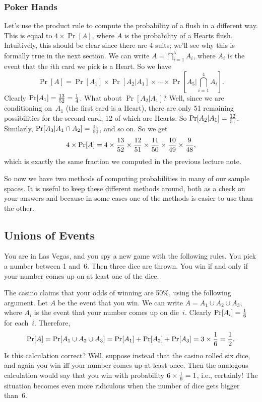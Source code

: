 \documentclass[11pt]{article}
\begin{document}
\subsubsection*{Poker Hands}
Let's use the product rule to compute the probability of a flush in a different
way. This is equal to $4\times\Pr[A]$, where $A$ is the
probability of a Hearts flush. Intuitively, this should be clear since there are 4 suits; we'll
see why this is formally true in the next section. We can write $A=\bigcap_{i=1}^5 A_i$,
where $A_i$ is the event that the $i$th card we pick is a Heart.
So we have $$
   {\textstyle\Pr[A]=\Pr[A_1]\times\Pr[A_2\vert A_1]\times\cdots\times
                \Pr[A_5\vert\bigcap_{i=1}^4 A_i]}.  $$
Clearly $\Pr[A_1]={{13}\over{52}}={1\over 4}$.  What about
$\Pr[A_2\vert A_1]$?  Well, since we are conditioning on~$A_1$ (the
first card is a Heart), there are only 51 remaining possibilities for
the second card, 12 of which are Hearts.
So $\Pr[A_2\vert A_1]={{12}\over{51}}$.  Similarly,
$\Pr[A_3\vert A_1\cap A_2]={{11}\over{50}}$, and so on.  So we get $$
   4\times\Pr[A]=4\times{{13}\over{52}}\times{{12}\over{51}}\times{{11}\over{50}}\times{{10}\over{49}}\times{{9}\over{48}},  $$
which is exactly the same fraction we computed in the previous lecture note.

So now we have two methods of computing probabilities in many of our
sample spaces.  It is useful to keep these different methods around,
both as a check on your answers and because in some cases one of the
methods is easier to use than the other.



\subsection*{Unions of Events}
You are in Las Vegas, and you spy a new game with the following rules.
You pick a number between 1 and~6.  Then three dice are thrown.  You
win if and only if your number comes up on at least one of the dice.

The casino claims that your odds of winning are 50\%, using the
following argument.  Let $A$ be the event that you win.  We can write
$A=A_1\cup A_2\cup A_3$, where $A_i$ is the event that your number
comes up on die~$i$.  Clearly $\Pr[A_i]={1\over 6}$ for each~$i$.
Therefore, $$
   \Pr[A]=\Pr[A_1\cup A_2\cup A_3] = \Pr[A_1]+\Pr[A_2]+\Pr[A_3]
                       = 3\times{1\over 6} = {1\over 2}.  $$
Is this calculation correct?  Well, suppose instead that the casino
rolled six dice, and again you win iff your number comes up at least
once.  Then the analogous calculation would say that you win
with probability $6\times{1\over 6}=1$, i.e., certainly!  The
situation becomes even more ridiculous when the number of dice gets
bigger than~6.
\end{document}
